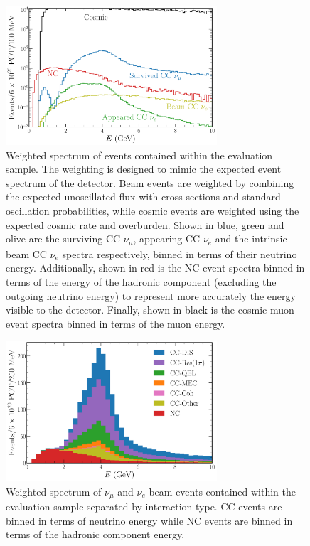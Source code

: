 \begin{figure} %
    \includegraphics[width=0.7\textwidth]{diagrams/7-results/explore_osc_fluxes.pdf}
    \caption[Weighted spectrum of evaluation sample events]
    {Weighted spectrum of events contained within the evaluation sample. The weighting is designed
        to mimic the expected event spectrum of the \chipsfive detector. Beam events are weighted by
        combining the expected unoscillated flux with cross-sections and standard oscillation
        probabilities, while cosmic events are weighted using the expected cosmic rate and overburden.
        Shown in blue, green and olive are the surviving CC $\nu_{\mu}$, appearing CC $\nu_{e}$ and
        the intrinsic beam CC $\nu_{e}$ spectra respectively, binned in terms of their neutrino
        energy. Additionally, shown in red is the NC event spectra binned in terms of the energy of
        the hadronic component (excluding the outgoing neutrino energy) to represent more accurately
        the energy visible to the detector. Finally, shown in black is the cosmic muon event spectra
        binned in terms of the muon energy.}
    \label{fig:explore_osc_fluxes}
\end{figure}

\begin{figure} %
    \includegraphics[width=0.7\textwidth]{diagrams/7-results/explore_stacked_int_types.pdf}
    \caption[Weighted spectrum of interaction types within the evaluation sample]
    {Weighted spectrum of $\nu_{\mu}$ and $\nu_{e}$ beam events contained within the evaluation
        sample separated by interaction type. CC events are binned in terms of neutrino energy while
        NC events are binned in terms of the hadronic component energy.}
    \label{fig:explore_stacked_int_types}
\end{figure}

